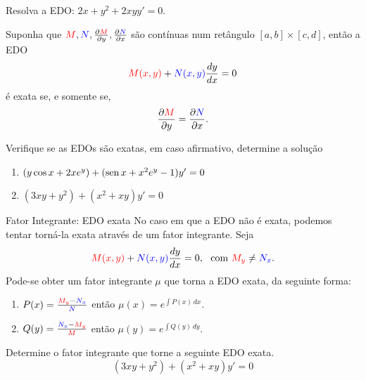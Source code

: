 \begin{frame}
\begin{exe}
Resolva a EDO: $2x+y^2+2xyy'=0$.
\end{exe}

\begin{teo}
Suponha que ${\color{red}M}, {\color{blue} N}, \frac{\partial {\color{red}M}}{\partial y},\frac{\partial {\color{blue} N}}{\partial x}$ são contínuas num retângulo $[a,b]\times[c,d]$, então a EDO
\[{\color{red}M(x,y)}+{\color{blue}N(x,y)}\frac{dy}{dx}=0\]
é exata se, e somente se, 
\[\frac{\partial \color{red}M}{\partial y }=\frac{\partial {\color{blue} N}}{\partial x}.\]
\end{teo}
\end{frame}


\begin{frame}
\begin{exe}
Verifique se as EDOs são exatas, em caso afirmativo, determine a solução
\begin{enumerate}
\item $(y\cos x+2xe^y)+(\operatorname{sen} x +x^2e^y-1)y'=0$

\item $(3xy+y^2)+(x^2+xy)y'=0$
\end{enumerate}

\end{exe}
\end{frame}

\begin{frame}{Fator Integrante: EDO exata}
No caso em que a EDO não é exata, podemos tentar torná-la exata através de um fator integrante. Seja 
\[{\color{red}M(x,y)}+{\color{blue}N(x,y)}\frac{dy}{dx}=0,\ \text{ com } {\color{red}M_y}\neq {\color{blue}N_x}.\]
Pode-se obter um fator integrante $\mu$  que torna a EDO exata, da seguinte forma:
\begin{enumerate}
\item $P(x)=\frac{{\color{red}M_y}-{\color{blue}N_x}}{{\color{blue}N}}$ então
$\mu(x)=e^{\int P(x)\,dx}$.


\item $Q(y)=\frac{{\color{blue}N_x}-{\color{red}M_y}}{{\color{red}M}}$ então
$\mu(y)=e^{\int Q(y)\,dy}$.
\end{enumerate}

\begin{exe}
Determine o fator integrante que torne a seguinte EDO exata.
\[(3xy+y^2)+(x^2+xy)y'=0\]
\end{exe}
\end{frame}

